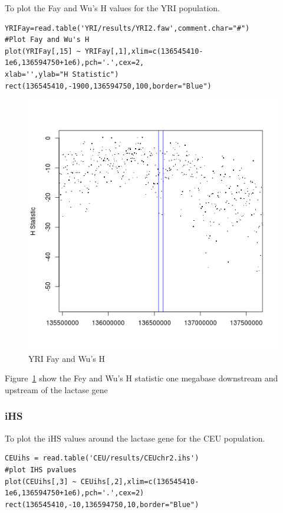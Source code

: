 To plot the Fay and Wu's H values for the YRI population.\\
\begin{verbatim}
YRIFay=read.table('YRI/results/YRI2.faw',comment.char="#")
#Plot Fay and Wu's H
plot(YRIFay[,15] ~ YRIFay[,1],xlim=c(136545410-1e6,136594750+1e6),pch='.',cex=2,
xlab='',ylab="H Statistic")
rect(136545410,-1900,136594750,100,border="Blue") 
\end{verbatim}
\begin{figure}
\centering
\includegraphics{pictures/YRIFay.png}
\caption{YRI Fay and Wu's H}
\label{fig:fayyri}
\end{figure}
Figure~\ref{fig:fayyri} show the Fey and Wu's H statistic one megabase downstream and upstream of the lactase gene

\subsubsection{iHS}
To plot the iHS values around the lactase gene for the CEU population.\\
\begin{verbatim}
CEUihs = read.table('CEU/results/CEUchr2.ihs')
#plot IHS pvalues
plot(CEUihs[,3] ~ CEUihs[,2],xlim=c(136545410-1e6,136594750+1e6),pch='.',cex=2)
rect(136545410,-10,136594750,10,border="Blue") 
\end{verbatim}


